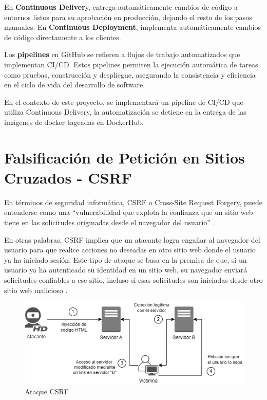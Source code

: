 En \textbf{Continuous Deliver}y, entrega automáticamente cambios de código a entornos listos para su aprobación en producción, dejando el resto de los pasos manuales.
En \textbf{Continuous Deployment}, implementa automáticamente cambios de código directamente a los clientes.

Los \textbf{pipelines} en GitHub se refieren a flujos de trabajo automatizados que implementan CI/CD. Estos pipelines permiten la ejecución automática de tareas como pruebas, construcción y despliegue, asegurando la consistencia y eficiencia en el ciclo de vida del desarrollo de software.

En el contexto de este proyecto, se implementará un pipeline de CI/CD que utiliza Continuous Delivery, la automatización se detiene en la entrega de las imágenes de docker tageadas en DockerHub.



\section{Falsificación de Petición en Sitios Cruzados - CSRF}\label{sec:csrf-attack}

En términos de seguridad informática, CSRF o Cross-Site Request Forgery, puede entenderse como una ``vulnerabilidad que explota la confianza que un sitio web tiene en las solicitudes originadas desde el navegador del usuario'' \cite{csrf}.

En otras palabras, CSRF implica que un atacante logra engañar al navegador del usuario para que realice acciones no deseadas en otro sitio web donde el usuario ya ha iniciado sesión. Este tipo de ataque se basa en la premisa de que, si un usuario ya ha autenticado su identidad en un sitio web, su navegador enviará solicitudes confiables a ese sitio, incluso si esas solicitudes son iniciadas desde otro sitio web malicioso .


\begin{figure}[h]
    \centering
    \includegraphics[width=0.9\linewidth]{fig/csrf.png}
    \caption{Ataque CSRF}
    \label{fig:csrf-attack}
\end{figure}


